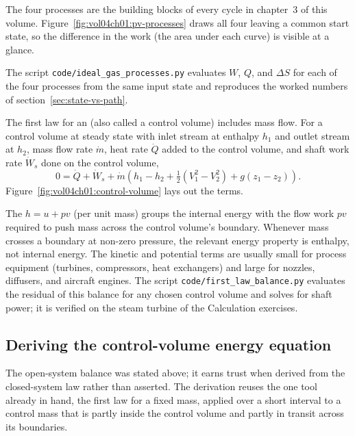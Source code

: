 The four processes are the building blocks of every cycle in chapter~3
of this volume. Figure~\ref{fig:vol04ch01:pv-processes} draws all four
leaving a common start state, so the difference in the work (the area
under each curve) is visible at a glance.



The script \texttt{code/ideal\_gas\_processes.py} evaluates $W$, $Q$,
and $\Delta S$ for each of the four processes from the same input state
and reproduces the worked numbers of section~\ref{sec:state-vs-path}.

The first law for an  (also called a control
volume) includes mass flow. For a control volume at steady state with
inlet stream at enthalpy $h_1$ and outlet stream at $h_2$, mass flow
rate $\dot{m}$, heat rate $\dot{Q}$ added to the control volume, and
shaft work rate $\dot{W}_s$ done on the control volume,
\[
0 = \dot{Q} + \dot{W}_s + \dot{m}\left(h_1 - h_2 + \tfrac{1}{2}(V_1^2 -
V_2^2) + g(z_1 - z_2)\right).
\]
Figure~\ref{fig:vol04ch01:control-volume} lays out the terms.



The  $h = u + pv$ (per unit mass) groups the
internal energy with the flow work $pv$ required to push mass across
the control volume's boundary. Whenever mass crosses a boundary at
non-zero pressure, the relevant energy property is enthalpy, not
internal energy. The kinetic and potential terms are usually small for
process equipment (turbines, compressors, heat exchangers) and large
for nozzles, diffusers, and aircraft engines. The script
\texttt{code/first\_law\_balance.py} evaluates the residual of this
balance for any chosen control volume and solves for shaft power; it
is verified on the steam turbine of the Calculation exercises.

\subsection{Deriving the control-volume energy equation}

The open-system balance was stated above; it earns trust when derived
from the closed-system law rather than asserted. The derivation reuses
the one tool already in hand, the first law for a fixed mass, applied
over a short interval to a control mass that is partly inside the
control volume and partly in transit across its boundaries.

